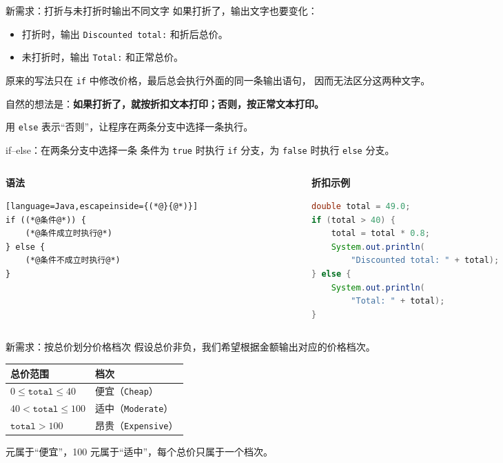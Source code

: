 \documentclass[aspectratio=169]{beamer}
\begin{document}
\begin{frame}{新需求：打折与未打折时输出不同文字}
  如果打折了，输出文字也要变化：
  \begin{itemize}
    \item 打折时，输出 \texttt{Discounted total:} 和折后总价。
    \item 未打折时，输出 \texttt{Total:} 和正常总价。
  \end{itemize}
  \bigskip
  原来的写法只在 \texttt{if} 中修改价格，最后总会执行外面的同一条输出语句，
  因而无法区分这两种文字。
  \par\bigskip
  自然的想法是：\textbf{如果打折了，就按折扣文本打印；否则，按正常文本打印。}
  \par\medskip
  用 \texttt{else} 表示“否则”，让程序在两条分支中选择一条执行。
\end{frame}

\begin{frame}[fragile]{if--else：在两条分支中选择一条}
  条件为 \texttt{true} 时执行 \texttt{if} 分支，为 \texttt{false} 时执行 \texttt{else} 分支。
  \par\medskip
  \begin{columns}[T,onlytextwidth]
    \begin{column}{0.35\textwidth}
      \textbf{语法}
  \begin{lstlisting}[language=Java,escapeinside={(*@}{@*)}]
if ((*@条件@*)) {
    (*@条件成立时执行@*)
} else {
    (*@条件不成立时执行@*)
}
  \end{lstlisting}
    \end{column}
    \begin{column}{0.62\textwidth}
      \textbf{折扣示例}
  \begin{lstlisting}[language=Java]
double total = 49.0;
if (total > 40) {
    total = total * 0.8;
    System.out.println(
        "Discounted total: " + total);
} else {
    System.out.println(
        "Total: " + total);
}
  \end{lstlisting}
    \end{column}
  \end{columns}
\end{frame}

\begin{frame}{新需求：按总价划分价格档次}
  假设总价非负，我们希望根据金额输出对应的价格档次。
  \par\bigskip
  \begin{center}
    \renewcommand{\arraystretch}{1.4}
    \begin{tabular}{ll}
      \textbf{总价范围} & \textbf{档次} \\
      \hline
      $0 \leq \texttt{total} \leq 40$ & 便宜（\texttt{Cheap}） \\
      $40 < \texttt{total} \leq 100$ & 适中（\texttt{Moderate}） \\
      $\texttt{total} > 100$ & 昂贵（\texttt{Expensive}） \\
    \end{tabular}
  \end{center}
   元属于“便宜”，100 元属于“适中”，每个总价只属于一个档次。
\end{frame}
\end{document}
